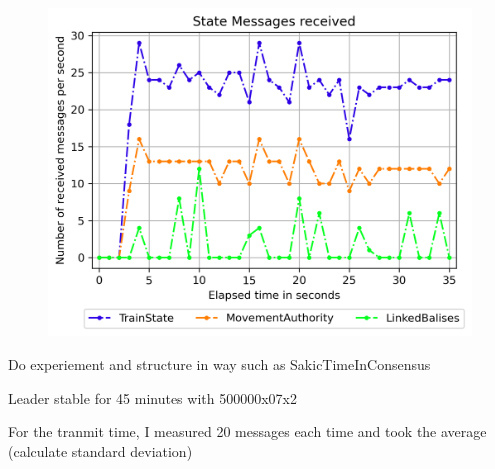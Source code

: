 \begin{figure}[!htb]
	\centering
	\includegraphics[width=0.75\linewidth]{images/plots/StateMessagesReceive}
	\caption{}
	\label{fig:PlotStateMessagesReceive}
\end{figure}


Do experiement and structure in way such as SakicTimeInConsensus

Leader stable for 45 minutes with 500000x07x2

For the tranmit time, I measured 20 messages each time and took the average (calculate standard deviation)
\fi
